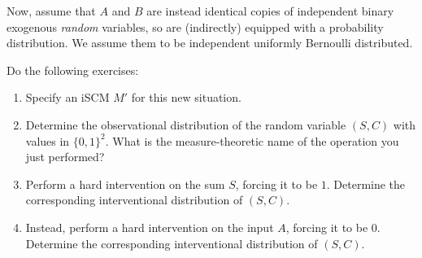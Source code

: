 \begin{enumerate}[label=9.\arabic*]
    Now, assume that $A$ and $B$ are instead identical copies of independent binary exogenous \emph{random} variables, so are (indirectly) equipped with a probability distribution.
    We assume them to be independent uniformly Bernoulli distributed.

    Do the following exercises:
    \begin{enumerate}[resume*]
        \item Specify an iSCM $M'$ for this new situation.
        \item Determine the observational distribution of the random variable $(S, C)$ with values in $\{0, 1\}^2$. What is the measure-theoretic name of the operation you just performed?
        \item Perform a hard intervention on the sum $S$, forcing it to be $1$. Determine the corresponding interventional distribution of $(S, C)$.
        \item Instead, perform a hard intervention on the input $A$, forcing it to be $0$. Determine the corresponding interventional distribution of $(S, C)$.
    \end{enumerate}


\end{enumerate}
